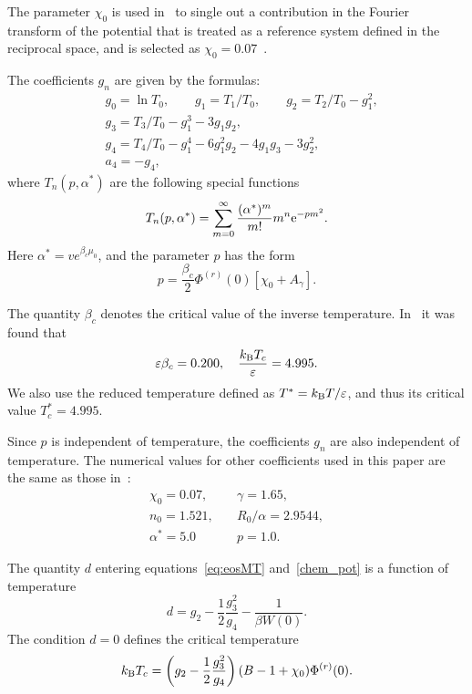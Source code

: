 \documentclass[fleqn,twoside,twocolumn,nofootinbib,showkeys]{revtex4} %
\begin{document}
	The parameter $\chi_0$ is used in~\cite{KozlovskiiDobush2020} to single out a contribution in the Fourier transform of the potential that is treated as a reference system defined in the reciprocal space, and is selected as $\chi_0 = 0.07$~\cite{KozlovskiiDobush2020}.
	
	The coefficients $g_n$ are given by the formulas:
	\begin{align}
		& g_0 = \ln T_0, \qquad g_1 = T_1/T_0, \qquad g_2 = T_2/T_0 - g_1^2,  
		\nonumber \\
		& g_3 = T_3/T_0 - g_1^3 - 3g_1 g_2, 
		\nonumber\\
		& g_4 = T_4/T_0 - g_1^4 - 6 g_1^2 g_2 - 4 g_1 g_3 - 3 g_2^2, 
		\nonumber\\
		& a_4 = -g_4,
	\end{align}
	where $T_n(p,\alpha^*)$ are the following special functions
	\begin{equation}
		T_n(p,\alpha^*) = \sum_{m=0}^{\infty} \frac{(\alpha^*)^m}{m!} m^n {\rm e}^{-pm^2}.
	\end{equation}
	Here $\alpha^*=v e^{\beta_c\mu_0}$, and the parameter $p$ has the form
	\begin{equation}
		p = \frac{\beta_c}{2} \Phi^{(r)}(0) [\chi_0 + A_\gamma].
	\end{equation} 
	
	The quantity $\beta_c$ denotes the critical value of the inverse temperature. In~\cite{KozlovskiiDobush2020} it was found that
	\begin{equation*}
		\varepsilon\beta_c = 0.200, \quad \frac{k_{\rm B} T_c}{\varepsilon} = 4.995.
	\end{equation*}
	We also use the reduced temperature defined as $T^* = k_{\rm B}T/\varepsilon$, and thus its critical value $T^*_c = 4.995.$
	
	Since $p$ is independent of temperature, the coefficients $g_n$ are also independent of temperature. The numerical values for other coefficients used in this paper are the same as those in~\cite[eqs.~(5), (23), and~(24)]{KozlovskiiDobush2020}:
	\begin{eqnarray}
		\label{params}
		\chi_0 = 0.07, & \quad \gamma = 1.65, \nonumber\\
		n_0 = 1.521, & \quad R_0/\alpha = 2.9544, \nonumber\\
		\alpha^* = 5.0 & \quad p = 1.0.
	\end{eqnarray}
	
	The quantity $d$ entering equations~\eqref{eq:eosMT} and~\eqref{chem_pot} is a function of temperature
	\begin{equation}
		\label{def:D0}
		d = g_2 - \frac{1}{2} \frac{g_3^2}{g_4} - \frac{1}{\beta W(0)}.
	\end{equation}
	The condition $d = 0$ defines the critical temperature~\cite{KozlovskiiDobush2020}
	\begin{equation}
		k_{\rm B}T_c = \left(g_2 - \frac{1}{2} \frac{g_3^2}{g_4} \right) (B - 1 + \chi_0) \Phi^{(r)}(0).
	\end{equation}  
	
\end{document}
